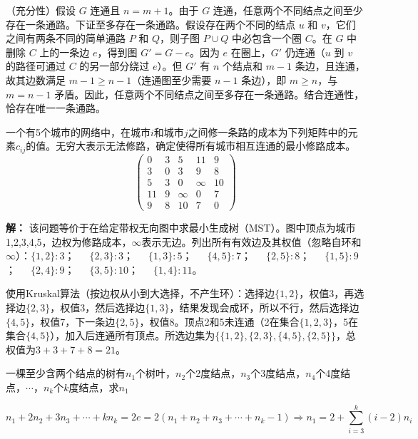 \documentclass[lang=cn,11pt]{elegantbook}
\begin{document}
（充分性）假设 $G$ 连通且 $n = m+1$。由于 $G$ 连通，任意两个不同结点之间至少存在一条通路。下证至多存在一条通路。假设存在两个不同的结点 $u$ 和 $v$，它们之间有两条不同的简单通路 $P$ 和 $Q$，则子图 $P \cup Q$ 中必包含一个圈 $C$。在 $G$ 中删除 $C$ 上的一条边 $e$，得到图 $G' = G - e$。因为 $e$ 在圈上，$G'$ 仍连通（$u$ 到 $v$ 的路径可通过 $C$ 的另一部分绕过 $e$）。但 $G'$ 有 $n$ 个结点和 $m-1$ 条边，且连通，故其边数满足 $m-1 \ge n-1$（连通图至少需要 $n-1$ 条边），即 $m \ge n$，与 $m = n-1$ 矛盾。因此，任意两个不同结点之间至多存在一条通路。结合连通性，恰存在唯一一条通路。

\begin{example}
    一个有5个城市的网络中，在城市$i$和城市$j$之间修一条路的成本为下列矩阵中的元素$c_{ij}$的值。无穷大表示无法修路，确定使得所有城市相互连通的最小修路成本。
    \[\begin{pmatrix}
        0&3&5&11&9\\
        3&0&3&9&8\\
        5&3&0&\infty&10\\
        11&9&\infty&0&7\\
        9&8&10&7&0
    \end{pmatrix}\]
\end{example}
\textbf{解：} 该问题等价于在给定带权无向图中求最小生成树（MST）。图中顶点为城市1,2,3,4,5，边权为修路成本，$\infty$表示无边。列出所有有效边及其权值（忽略自环和$\infty$）：$\{1,2\}:3$；~~~$\{2,3\}:3$；~~~$\{1,3\}:5$；~~~$\{4,5\}:7$；~~~$\{2,5\}:8$；~~~$\{1,5\}:9$；~~~$\{2,4\}:9$；~~~$\{3,5\}:10$；~~~$\{1,4\}:11$。

使用Kruskal算法（按边权从小到大选择，不产生环）：选择边$\{1,2\}$，权值3，再选择边$\{2,3\}$，权值3，然后选择边$\{1,3\}$，结果发现会成环，所以不行，然后选择边$\{4,5\}$，权值7，下一条边$\{2,5\}$，权值8。顶点2和5未连通（2在集合$\{1,2,3\}$，5在集合$\{4,5\}$），加入后连通所有顶点。所选边集为$\bigl\{\{1,2\},\{2,3\},\{4,5\},\{2,5\}\bigr\}$，总权值为$3+3+7+8=21$。
\begin{example}
    一棵至少含两个结点的树有$n_1$个树叶，$n_2$个2度结点，$n_3$个3度结点，$n_4$个4度结点，$\cdots$，$n_k$个$k$度结点，求$n_1$
\end{example}
\vspace{-20pt}\[n_1+2n_2+3n_3+\cdots+kn_k=2e=2(n_1+n_2+n_3+\cdots+n_k-1)\Rightarrow n_1 = 2 + \sum_{i=3}^k (i-2)n_i\]
\end{document}
